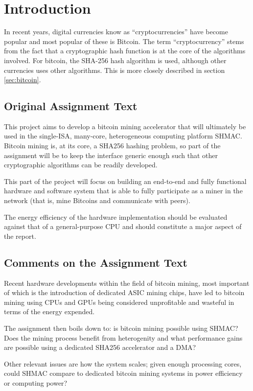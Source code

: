\chapter{Introduction}

In recent years, digital currencies know as ``cryptocurrencies'' have become popular
and most popular of these is Bitcoin. The term ``cryptocurrency'' stems from the fact
that a cryptographic hash function is at the core of the algorithms involved. For bitcoin,
the SHA-256 hash algorithm is used, although other currencies uses other algorithms. This
is more closely described in section \ref{sec:bitcoin}.


\section{Original Assignment Text}

This project aims to develop a bitcoin mining accelerator that will ultimately be
used in the single-ISA, many-core, heterogeneous computing platform SHMAC. Bitcoin
mining is, at its core, a SHA256 hashing problem, so part of the assignment will
be to keep the interface generic enough such that other cryptographic algorithms
can be readily developed.

This part of the project will focus on building an end-to-end and fully functional
hardware and software system that is able to fully participate as a miner in the
network (that is, mine Bitcoins and communicate with peers).

The energy efficiency of the hardware implementation should be evaluated against that
of a general-purpose CPU and should constitute a major aspect of the report.

\section{Comments on the Assignment Text}

Recent hardware developments within the field of bitcoin mining, most important of
which is the introduction of dedicated ASIC mining chips, have led to bitcoin mining
using CPUs and GPUs being considered unprofitable and wasteful in terms of the energy
expended.

The assignment then boils down to: is bitcoin mining possible using SHMAC? Does the
mining process benefit from heterogenity and what performance gains are possible
using a dedicated SHA256 accelerator and a DMA?

Other relevant issues are how the system scales; given enough processing cores,
could SHMAC compare to dedicated bitcoin mining systems in power efficiency or
computing power?

